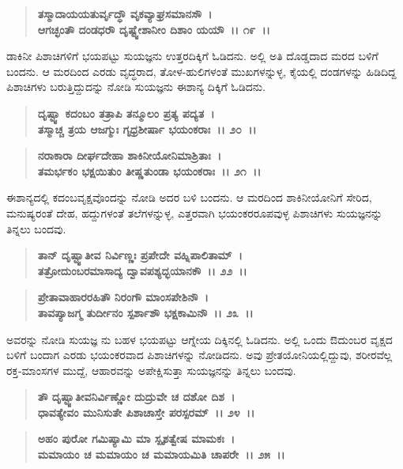 \begin{verse}
\textbf{ತಸ್ಮಾದಾಯಯತುರ್ವೃದ್ಧೌ ವೃಕವ್ಯಾಘ್ರಸಮಾನಸೌ~।}\\\textbf{ಆಗಚ್ಛಂತೌ ದಂಡಧರೌ ದೃಷ್ಟ್ವೇಶಾನೀಂ ದಿಶಾಂ ಯಯೌ~।। ೧೯~।।}
\end{verse}

ಡಾಕಿನೀ ಪಿಶಾಚಿಗಳಿಗೆ ಭಯಪಟ್ಟು ಸುಯಜ್ಞನು ಉತ್ತರದಿಕ್ಕಿಗೆ ಓಡಿದನು. ಅಲ್ಲಿ ಅತಿ ದೊಡ್ಡದಾದ ಮರದ ಬಳಿಗೆ ಬಂದನು. ಆ ಮರದಿಂದ ಎರಡು ವೃದ್ಧರಾದ, ತೋಳ-\-ಹುಲಿಗಳಂತೆ ಮುಖಗಳನ್ನುಳ್ಳ, ಕೈಯಲ್ಲಿ ದಂಡಗಳನ್ನು ಹಿಡಿದಿದ್ದ ಪಿಶಾಚಿಗಳು ಬರುತ್ತಿದ್ದುದನ್ನು ನೋಡಿ ಸುಯಜ್ಞನು ಈಶಾನ್ಯ ದಿಕ್ಕಿಗೆ ಓಡಿದನು.

\begin{verse}
\textbf{ದೃಷ್ಟ್ವಾ ಕದಂಬಂ ತತ್ರಾಪಿ ತನ್ಮೂಲಂ ಪ್ರತ್ಯ ಪದ್ಯತ~।}\\\textbf{ತಸ್ಮಾಚ್ಚ ತ್ರಯ ಆಜಗ್ಮುಃ ಗೃಧ್ರಶೀರ್ಷಾ ಭಯಂಕರಾಃ~।। ೨೦~।। }
\end{verse}

\begin{verse}
\textbf{ನರಾಕಾರಾ ದೀರ್ಘದೇಹಾ ಶಾಕಿನೀಯೋನಿಮಾಶ್ರಿತಾಃ~।}\\\textbf{ತಮರ್ಭಕಂ ಭಕ್ಷಯಿತುಂ ತೀಷ್ಣತುಂಡಾ ಭಯಂಕರಾಃ~।। ೨೧~।।}
\end{verse}

ಈಶಾನ್ಯದಲ್ಲಿ ಕದಂಬವೃಕ್ಷವೊಂದನ್ನು ನೋಡಿ ಅದರ ಬಳಿ ಬಂದನು. ಆ ಮರದಿಂದ ಶಾಕಿನೀಯೋನಿಗೆ ಸೇರಿದ, ಮನುಷ್ಯರಂತೆ ದೇಹ, ಹದ್ದುಗಳಂತೆ ತಲೆಗಳನ್ನುಳ್ಳ, ಎತ್ತರವಾಗಿ ಭಯಂಕರರೂಪವುಳ್ಳ ಪಿಶಾಚಿಗಳು ಸುಯಜ್ಞನನ್ನು ತಿನ್ನಲು ಬಂದವು.

\begin{verse}
\textbf{ತಾನ್ ದೃಷ್ಟ್ವಾತೀವ ನಿರ್ವಿಣ್ಣಃ ಪ್ರಪೇದೇ ವಹ್ನಿಪಾಲಿತಾಮ್~।}\\\textbf{ತತ್ರೋದುಂಬರಮಾಸಾದ್ಯ ದ್ವಾವಪಶ್ಯದ್ಭಯಾನಕೌ~।। ೨೨~।। }
\end{verse}

\begin{verse}
\textbf{ಪ್ರೇತಾವಾಹಾರರಹಿತೌ ನಿರಂಗೌ ಮಾಂಸಪೇಶಿನೌ~।}\\\textbf{ತಾವಪ್ಯಾಜಗ್ಮ ತುರ್ದೀನಂ ಸ್ಪರ್ಶಾಶೌ ಭಕ್ಷಕಾಮಿನೌ~।। ೨೩~।।}
\end{verse}

ಅವರನ್ನು ನೋಡಿ ಸುಯಜ್ಞ ನು ಬಹಳ ಭಯಪಟ್ಟು ಆಗ್ನೇಯ ದಿಕ್ಕಿನಲ್ಲಿ ಓಡಿದನು. ಅಲ್ಲಿ ಒಂದು ಔದುಂಬರ ವೃಕ್ಷದ ಬಳಿಗೆ ಬಂದಾಗ ಎರಡು ಭಯಂಕರವಾದ ಪಿಶಾಚಿಗಳನ್ನು ನೋಡಿದನು. ಅವು ಪ್ರೇತಯೋನಿಯಲ್ಲಿದ್ದುವು, ಶರೀರವೆಲ್ಲ ರಕ್ತ-ಮಾಂಸಗಳ ಮುದ್ದೆ, ಆಹಾರವನ್ನು ಅಪೇಕ್ಷಿಸುತ್ತಾ ಸುಯಜ್ಞನನ್ನು ತಿನ್ನಲು ಬಂದವು.

\begin{verse}
\textbf{ತೌ ದೃಷ್ಟ್ವಾತೀವನಿರ್ವಿಣ್ಣೋ ದುದ್ರುವೇ ಚ ದಶೋ ದಿಶ~।}\\\textbf{ಧಾವತ್ಯೇವಂ ಮುನಿಸುತೇ ಪಿಶಾಚಾಸ್ತೇ ಪರಸ್ಪರಮ್~।। ೨೪~।। }
\end{verse}

\begin{verse}
\textbf{ಅಹಂ ಪುರೋ ಗಮಿಷ್ಯಾಮಿ ಮಾ ಸ್ಪೃಶತ್ವೇಷ ಮಾಮಕಃ~।}\\\textbf{ಮಮಾಯಂ ಚ ಮಮಾಯಂ ಚ ಮಮಾಯಮಿತಿ ಚಾಪರೇ~।। ೨೫~।।}
\end{verse}

